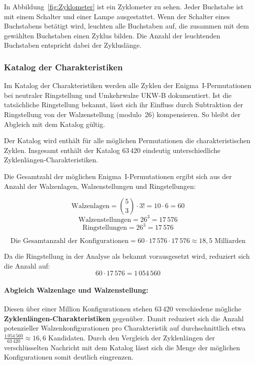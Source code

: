 \documentclass[12pt, ngerman, a4paper, numbers=noenddot]{article}
\begin{document}
In Abbildung~\ref{fig:Zyklometer} ist ein Zyklometer zu sehen. Jeder Buchstabe ist mit einem Schalter und einer Lampe ausgestattet. Wenn der Schalter eines Buchstabens betätigt wird, leuchten alle Buchstaben auf, die zusammen mit dem gewählten Buchstaben einen Zyklus bilden. Die Anzahl der leuchtenden Buchstaben entspricht dabei der Zykluslänge.






\subsubsection{Katalog der Charakteristiken}

Im Katalog der Charakteristiken werden alle Zyklen der Enigma~I-Permutationen bei neutraler Ringstellung und Umkehrwalze UKW-B dokumentiert. Ist die tatsächliche Ringstellung bekannt, lässt sich ihr Einfluss durch Subtraktion der Ringstellung von der Walzenstellung (modulo~26) kompensieren. So bleibt der Abgleich mit dem Katalog gültig.



Der Katalog wird enthält für alle möglichen Permutationen die charakteristischen Zyklen. Insgesamt enthält der Katalog \(63\,420\) eindeutig unterschiedliche Zyklenlängen-Charakteristiken.



\newpage
Die Gesamtzahl der möglichen Enigma~I-Permutationen ergibt sich aus der Anzahl der Walzenlagen, Walzenstellungen und Ringstellungen:

\[
\text{Walzenlagen} = \binom{5}{3} \cdot 3! = 10 \cdot 6 = 60
\]
\[
\text{Walzenstellungen} = 26^3 = 17\,576
\]
\[
\text{Ringstellungen} = 26^3 = 17\,576
\]

\[
\text{Die Gesamtanzahl der Konfigurationen} = 60 \cdot 17\,576 \cdot 17\,576 \approx 18{,}5 \text{ Milliarden}
\]

Da die Ringstellung in der Analyse als bekannt vorausgesetzt wird, reduziert sich die Anzahl auf:
\[
60 \cdot 17\,576 = 1\,054\,560
\]

\paragraph{Abgleich Walzenlage und Walzenstellung:}

Diesen über einer Million Konfigurationen stehen \(63\,420\) verschiedene mögliche \textbf{Zyklenlängen\hyp{}Charakteristiken} gegenüber. Damit reduziert sich die Anzahl potenzieller Walzenkonfigurationen pro Charakteristik auf durchschnittlich etwa \(\frac{1\,054\,560}{63\,420} \approx 16{,}6\) Kandidaten. Durch den Vergleich der Zyklenlängen der verschlüsselten Nachricht mit dem Katalog lässt sich die Menge der möglichen Konfigurationen somit deutlich eingrenzen.
\end{document}
